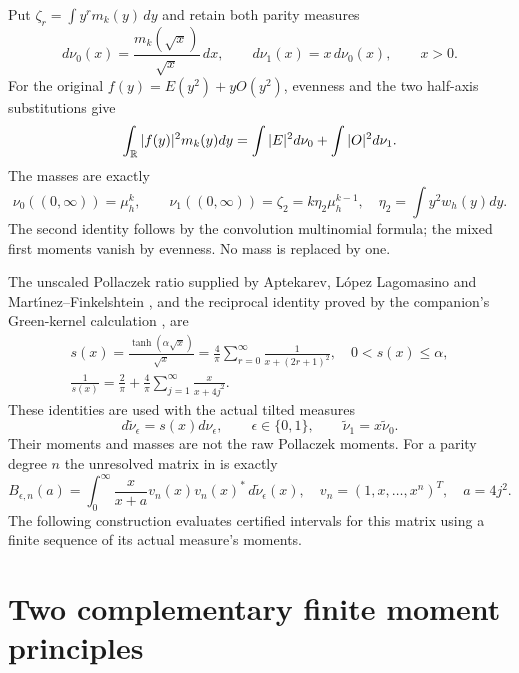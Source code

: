 \documentclass[11pt]{article}
\begin{document}
Put $\zeta_r=\int y^rm_k(y)\,dy$ and retain both parity measures
\begin{equation}\label{mmnative:eq:parities}
 d\nu_0(x)=\frac{m_k(\sqrt x)}{\sqrt x}\,dx,\qquad
 d\nu_1(x)=x\,d\nu_0(x),\qquad x>0.
\end{equation}
For the original $f(y)=E(y^2)+yO(y^2)$, evenness and the two
half-axis substitutions give
\begin{equation}\label{mmnative:eq:paritynorm}
 \int_\mathbb R|f(y)|^2m_k(y)dy
 =\int|E|^2d\nu_0+\int|O|^2d\nu_1.
\end{equation}
The masses are exactly
\[
 \nu_0((0,\infty))=\mu_h^k,\qquad
 \nu_1((0,\infty))=\zeta_2=k\eta_2\mu_h^{k-1},
 \quad\eta_2=\int y^2w_h(y)dy.
\]
The second identity follows by the convolution multinomial formula;
the mixed first moments vanish by evenness.  No mass is replaced by one.

The unscaled Pollaczek ratio supplied by Aptekarev, L\'opez Lagomasino
and Mart\'{\i}nez--Finkelshtein \cite{mmnative:ALM}, and the reciprocal identity
proved by the companion's Green-kernel calculation \cite{mmnative:PP}, are
\begin{equation}\label{mmnative:eq:s}
 \begin{gathered}
 s(x)=\frac{\tanh(\alpha\sqrt x)}{\sqrt x}
 =\frac4\pi\sum_{r=0}^\infty\frac1{x+(2r+1)^2},
 \quad0<s(x)\le\alpha,\\
 \frac1{s(x)}=\frac2\pi+\frac4\pi
       \sum_{j=1}^\infty\frac{x}{x+4j^2}.
 \end{gathered}
\end{equation}
These identities are used with the actual tilted measures
\begin{equation}\label{mmnative:eq:tilts}
 d\widetilde\nu_\epsilon=s(x)d\nu_\epsilon,
 \qquad\epsilon\in\{0,1\},
 \qquad\widetilde\nu_1=x\widetilde\nu_0.
\end{equation}
Their moments and masses are not the raw Pollaczek moments.  For a
parity degree $n$ the unresolved matrix in \cite{mmnative:TR} is exactly
\begin{equation}\label{mmnative:eq:target}
 B_{\epsilon,n}(a)=\int_0^\infty
 \frac{x}{x+a}v_n(x)v_n(x)^*\,d\widetilde\nu_\epsilon(x),
 \quad v_n=(1,x,\ldots,x^n)^T,\quad a=4j^2.
\end{equation}
The following construction evaluates certified intervals for this
matrix using a finite sequence of its actual measure's moments.

\section{Two complementary finite moment principles}
\end{document}
